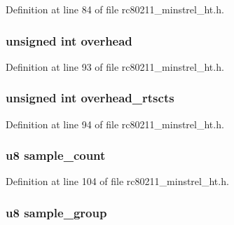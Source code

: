 Definition at line 84 of file rc80211\-\_\-minstrel\-\_\-ht.\-h.

\hypertarget{structminstrel__ht__sta_a0765a78b57d601d73281773e3e0b129d}{
\subsubsection[{overhead}]{\setlength{\rightskip}{0pt plus 5cm}unsigned int overhead}}\label{structminstrel__ht__sta_a0765a78b57d601d73281773e3e0b129d}


Definition at line 93 of file rc80211\-\_\-minstrel\-\_\-ht.\-h.

\hypertarget{structminstrel__ht__sta_afcd824a51bf0fbc50e8d7798d7c9c4eb}{
\subsubsection[{overhead\-\_\-rtscts}]{\setlength{\rightskip}{0pt plus 5cm}unsigned int overhead\-\_\-rtscts}}\label{structminstrel__ht__sta_afcd824a51bf0fbc50e8d7798d7c9c4eb}


Definition at line 94 of file rc80211\-\_\-minstrel\-\_\-ht.\-h.

\hypertarget{structminstrel__ht__sta_a344a0db2b0250fb750c41b09a5b2c02c}{
\subsubsection[{sample\-\_\-count}]{\setlength{\rightskip}{0pt plus 5cm}u8 sample\-\_\-count}}\label{structminstrel__ht__sta_a344a0db2b0250fb750c41b09a5b2c02c}


Definition at line 104 of file rc80211\-\_\-minstrel\-\_\-ht.\-h.

\hypertarget{structminstrel__ht__sta_a0d383c66830af0f8410c63cbf3c55273}{
\subsubsection[{sample\-\_\-group}]{\setlength{\rightskip}{0pt plus 5cm}u8 sample\-\_\-group}}\label{structminstrel__ht__sta_a0d383c66830af0f8410c63cbf3c55273}


